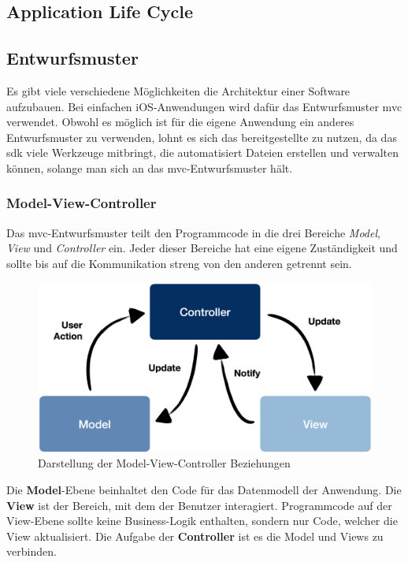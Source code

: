 \subsection{Application Life Cycle}
\subsection{Entwurfsmuster}
Es gibt viele verschiedene Möglichkeiten die Architektur einer Software aufzubauen.
Bei einfachen iOS-Anwendungen wird dafür das Entwurfsmuster \ac{mvc} verwendet.
Obwohl es möglich ist für die eigene Anwendung ein anderes Entwurfsmuster zu verwenden, lohnt es sich das bereitgestellte zu nutzen, da das \Gls{sdk} viele Werkzeuge mitbringt, die automatisiert Dateien erstellen und verwalten können, solange man sich an das \ac{mvc}-Entwurfsmuster hält.
\subsubsection{Model-View-Controller}
Das \ac{mvc}-Entwurfsmuster teilt den Programmcode in die drei Bereiche \textit{Model}, \textit{View} und \textit{Controller} ein.
Jeder dieser Bereiche hat eine eigene Zuständigkeit und sollte bis auf die Kommunikation streng von den anderen getrennt sein.
\begin{figure}[h!]
	\centering
	\includegraphics[scale=0.2]{images/model-view-controller}
	\caption{Darstellung der Model-View-Controller Beziehungen}
	\label{fig:model-view-controller}
\end{figure}
Die \textbf{Model}-Ebene beinhaltet den Code für das Datenmodell der Anwendung.\pbreak
Die \textbf{View} ist der Bereich, mit dem der Benutzer interagiert.
Programmcode auf der View-Ebene sollte keine Business-Logik enthalten, sondern nur Code, welcher die View aktualisiert.\pbreak
Die Aufgabe der \textbf{Controller} ist es die Model und Views zu verbinden.

